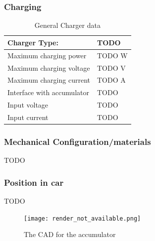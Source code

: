 \documentclass{article}
\begin{document}
\subsubsection{Charging}

	\begin{table}[H]
	    \centering
	    \begin{tabular}{|l|l|}
	        \hline
	        Charger Type: & TODO \\ \hline
	        Maximum charging power & TODO W \\ \hline
	        Maximum charging voltage & TODO V \\ \hline
	        Maximum charging current & TODO A \\ \hline
	        Interface with accumulator & TODO \\ \hline
	        Input voltage & TODO \\ \hline
	        Input current & TODO \\ \hline
	    \end{tabular}
	    \caption{General Charger data}
	    \label{charger}
	\end{table}

\subsubsection{Mechanical Configuration/materials}
TODO

\subsubsection{Position in car}
TODO

\begin{figure} [!ht]
	\centering  %
	
	\texttt{[image: render\_not\_available.png]}
	
	\caption{The CAD for the accumulator}
	
	\label{fig:accumulator_cad}
\end{figure}
\end{document}
